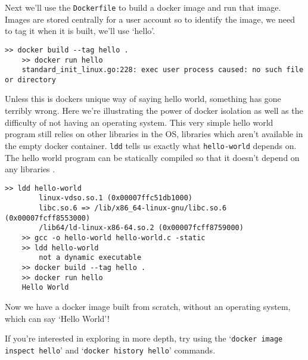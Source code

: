 \documentclass{csse4400}
\begin{document}
Next we'll use the \texttt{Dockerfile} to build a docker image and run that image.
Images are stored centrally for a user account so to identify the image, we need to tag it when it is built, we'll use `hello'.

\begin{shaded*}
\begin{lstlisting}[language=shell]
    >> docker build --tag hello .
    >> docker run hello
    standard_init_linux.go:228: exec user process caused: no such file or directory
\end{lstlisting}
\end{shaded*}

Unless this is dockers unique way of saying hello world, something has gone terribly wrong.
Here we're illustrating the power of docker isolation as well as the difficulty of not having an operating system.
This very simple hello world program still relies on other libraries in the OS, libraries which aren't available in the empty docker container.
\texttt{ldd} tells us exactly what \texttt{hello-world} depends on.
The hello world program can be statically compiled so that it doesn't depend on any libraries \cite{static-hello-world}.

\begin{shaded*}
\begin{lstlisting}[language=shell]
    >> ldd hello-world
        linux-vdso.so.1 (0x00007ffc51db1000)
        libc.so.6 => /lib/x86_64-linux-gnu/libc.so.6 (0x00007fcff8553000)
        /lib64/ld-linux-x86-64.so.2 (0x00007fcff8759000)
    >> gcc -o hello-world hello-world.c -static
    >> ldd hello-world
        not a dynamic executable
    >> docker build --tag hello .
    >> docker run hello
    Hello World
\end{lstlisting}
\end{shaded*}

Now we have a docker image built from scratch, without an operating system, which can say `Hello World'!
\begin{extra}
If you're interested in exploring in more depth, try using the `\texttt{docker image inspect hello}'
and `\texttt{docker history hello}' commands.
\end{extra}




\end{document}
